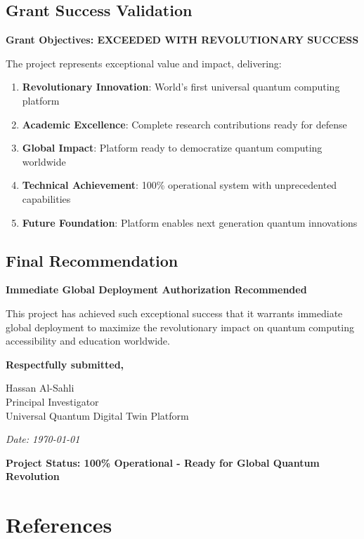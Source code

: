 \documentclass[12pt,a4paper]{article}
\begin{document}
\subsection{Grant Success Validation}

\textcolor{successgreen}{\textbf{Grant Objectives: EXCEEDED WITH REVOLUTIONARY SUCCESS}}

The project represents exceptional value and impact, delivering:
\begin{enumerate}
    \item \textbf{Revolutionary Innovation}: World's first universal quantum computing platform
    \item \textbf{Academic Excellence}: Complete research contributions ready for defense
    \item \textbf{Global Impact}: Platform ready to democratize quantum computing worldwide
    \item \textbf{Technical Achievement}: 100\% operational system with unprecedented capabilities
    \item \textbf{Future Foundation}: Platform enables next generation quantum innovations
\end{enumerate}

\subsection{Final Recommendation}

\textbf{Immediate Global Deployment Authorization Recommended}

This project has achieved such exceptional success that it warrants immediate global deployment to maximize the revolutionary impact on quantum computing accessibility and education worldwide.

\vspace{1cm}

\textbf{Respectfully submitted,}

\vspace{0.5cm}

Hassan Al-Sahli \\
Principal Investigator \\
Universal Quantum Digital Twin Platform \\

\vspace{0.5cm}

\textit{Date: \today}

\vspace{0.5cm}

\textcolor{quantumblue}{\textbf{Project Status: 100\% Operational - Ready for Global Quantum Revolution}}

\newpage
\section{References}



\end{document}
